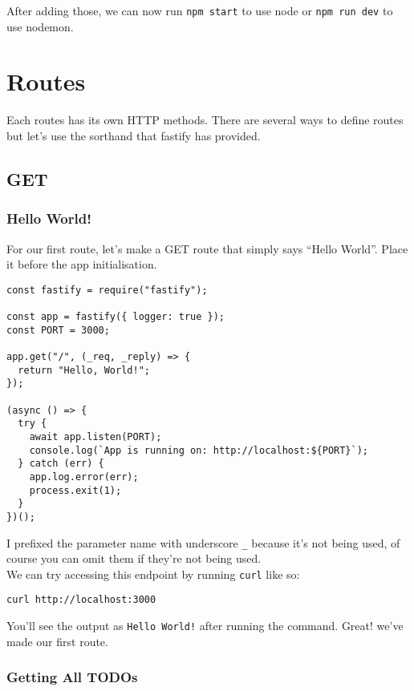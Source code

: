 \documentclass[a4paper,14pt,titlepage]{article}
\def\c#1{\texttt{#1}}
\begin{document}
After adding those, we can now run \c{npm start} to use node or
\c{npm run dev} to use nodemon.

\newpage

\section{Routes}

Each routes has its own HTTP methods. There are several ways to define routes
but let's use the sorthand that fastify has provided.

\subsection{GET}
\subsubsection{Hello World!}

For our first route, let's make a GET route that simply says ``Hello World''.
Place it before the app initialisation.

\begin{verbatim}
const fastify = require("fastify");

const app = fastify({ logger: true });
const PORT = 3000;

app.get("/", (_req, _reply) => {
  return "Hello, World!";
});

(async () => {
  try {
    await app.listen(PORT);
    console.log(`App is running on: http://localhost:${PORT}`);
  } catch (err) {
    app.log.error(err);
    process.exit(1);
  }
})();
\end{verbatim}

I prefixed the parameter name with underscore \c{\_} because it's not being
used, of course you can omit them if they're not being used.\\

We can try accessing this endpoint by running \c{curl} like so:

\begin{verbatim}
curl http://localhost:3000
\end{verbatim}

You'll see the output as \c{Hello World!} after running the command. Great!
we've made our first route.

\newpage

\subsubsection{Getting All TODOs}
\end{document}

